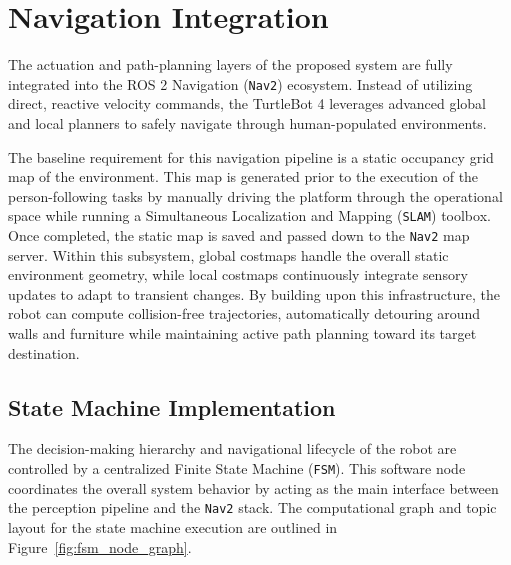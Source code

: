 %

\section{Navigation Integration}
The actuation and path-planning layers of the proposed system are fully integrated into the ROS 2 Navigation (\texttt{Nav2}) ecosystem. Instead of utilizing direct, reactive velocity commands, the TurtleBot 4 leverages advanced global and local planners to safely navigate through human-populated environments. 

The baseline requirement for this navigation pipeline is a static occupancy grid map of the environment. This map is generated prior to the execution of the person-following tasks by manually driving the platform through the operational space while running a Simultaneous Localization and Mapping (\texttt{SLAM}) toolbox. Once completed, the static map is saved and passed down to the \texttt{Nav2} map server. Within this subsystem, global costmaps handle the overall static environment geometry, while local costmaps continuously integrate sensory updates to adapt to transient changes. By building upon this infrastructure, the robot can compute collision-free trajectories, automatically detouring around walls and furniture while maintaining active path planning toward its target destination.



% 


\subsection{State Machine Implementation}
The decision-making hierarchy and navigational lifecycle of the robot are controlled by a centralized Finite State Machine (\texttt{FSM}). This software node coordinates the overall system behavior by acting as the main interface between the perception pipeline and the \texttt{Nav2} stack. The computational graph and topic layout for the state machine execution are outlined in Figure~\ref{fig:fsm_node_graph}.

